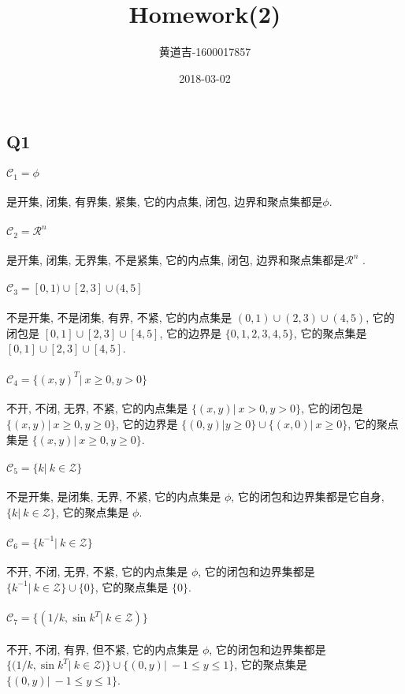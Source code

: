 \documentclass{article}
\title{Homework(2)}
\date{2018-03-02}
\author{
  \begin{CJK}{UTF8}{gbsn}
    黄道吉-1600017857
  \end{CJK}
}
\begin{document}
\begin{CJK}{UTF8}{gbsn}
\section{Q1}
  \paragraph{$\mathcal{C}_1 = \phi$}
    是开集, 闭集, 有界集, 紧集, 它的内点集, 闭包, 边界和聚点集都是$\phi$.
  \paragraph{$\mathcal{C}_2 = \mathcal{R}^n$}
    是开集, 闭集, 无界集, 不是紧集, 它的内点集, 闭包, 边界和聚点集都是$\mathcal{R}^n$ .
  \paragraph{$\mathcal{C}_3 = [0, 1) \cup [2, 3] \cup (4, 5]$}
    不是开集, 不是闭集, 有界, 不紧, 它的内点集是 $(0, 1) \cup (2, 3) \cup (4, 5)$, 它的闭包是 $[0, 1] \cup [2, 3] \cup [4, 5]$, 它的边界是 $\{0, 1, 2, 3, 4, 5\}$, 它的聚点集是 $[0, 1] \cup [2, 3] \cup [4, 5]$.
  \paragraph{$\mathcal{C}_4 = \{(x, y)^T |\  x \geq 0, y > 0\}$}
    不开, 不闭, 无界, 不紧, 它的内点集是 $\{(x, y)|\ x > 0, y > 0\}$, 它的闭包是 $\{(x, y)|\ x \ge 0, y \ge 0\}$, 它的边界是 $\{(0, y)|y \ge 0 \} \cup \{(x, 0)|\ x \ge 0\}$, 它的聚点集是 $\{(x, y)|\ x \ge 0, y \ge 0\}$.
  \paragraph{$\mathcal{C}_5 = \{k|\ k \in \mathcal{Z}\}$}
    不是开集, 是闭集, 无界, 不紧, 它的内点集是 $\phi$, 它的闭包和边界集都是它自身, $\{k|\ k \in \mathcal{Z}\}$, 它的聚点集是 $\phi$.
  \paragraph{$\mathcal{C}_6 = \{k^{-1}|\ k \in \mathcal{Z}\}$}
    不开, 不闭, 无界, 不紧, 它的内点集是 $\phi$, 它的闭包和边界集都是 $\{k^{-1}|\ k \in \mathcal{Z}\} \cup \{0\}$, 它的聚点集是 $\{0\}$.
  \paragraph{$\mathcal{C}_7 = \{(1 / k, \sin{k}^T|\ k \in \mathcal{Z})\}$}
    不开, 不闭, 有界, 但不紧, 它的内点集是 $\phi$, 它的闭包和边界集都是 $\{(1 / k, \sin{k}^T|\ k \in \mathcal{Z})\} \cup \{(0, y)|\ -1 \leq y \leq 1\}$, 它的聚点集是 $\{(0, y)|\ -1 \leq y \leq 1\}$.


\end{CJK}
\end{document}
